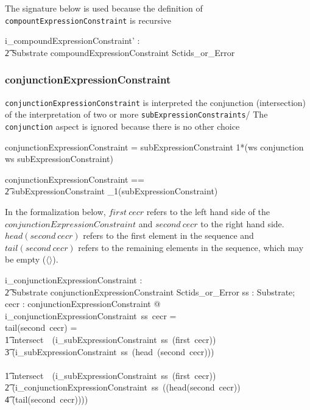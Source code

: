 \documentclass{article}
\def\spec#1{{\tt #1}}
\def\bnf#1{{\scriptsize {{#1}} }}
\begin{document}
The signature below is used because the definition of \spec{compountExpressionConstraint} is recursive
\begin{gendef}
   i\_compoundExpressionConstraint' : \\
\t2 Substrate \fun compoundExpressionConstraint \fun Sctids\_or\_Error
\end{gendef}


\subsubsection{conjunctionExpressionConstraint}
\spec{conjunctionExpressionConstraint} is interpreted the conjunction (intersection) of the interpretation of two or more
\spec{subExpressionConstraints}/  The \spec{conjunction} aspect is ignored because there is no other choice
\begin{framed}
\noindent
\bnf{conjunctionExpressionConstraint = subExpressionConstraint 1*(ws conjunction ws subExpressionConstraint)}
\end{framed}

\begin{zed}
conjunctionExpressionConstraint == \\
\t2 subExpressionConstraint \cross \seq_1(subExpressionConstraint)
\end{zed}

In the formalization below, $first ~cecr$ refers to the left hand side of the $conjunctionExpressionConstraint$ and
$second ~cecr$ to the right hand side.  $head (second~cecr)$ refers to the first element in the sequence and 
$tail (second~cecr)$ refers to the remaining elements in the sequence, which may be empty ($\langle \rangle$).

\begin{gendef}
    i\_conjunctionExpressionConstraint : \\
\t2 Substrate \fun conjunctionExpressionConstraint \fun Sctids\_or\_Error
\where
   \forall ss : Substrate;  cecr : conjunctionExpressionConstraint @ \\
i\_conjunctionExpressionConstraint~ss~cecr = \\
   \IF tail(second~cecr) = \langle \rangle \THEN \\
\t1 intersect~~(i\_subExpressionConstraint~ss~(first~cecr)) \\
\t3 (i\_subExpressionConstraint~ss~(head~(second~cecr))) \\
    \ELSE \\
\t1 intersect~~(i\_subExpressionConstraint~ss~(first~cecr)) \\
\t2 (i\_conjunctionExpressionConstraint~ss~((head(second~cecr)) \\
\t4 (tail(second~cecr))))
\end{gendef}
\end{document}
